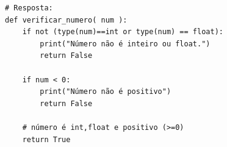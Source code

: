 \ifmostrarGabarito
\begin{verbatim}
# Resposta:
def verificar_numero( num ):
    if not (type(num)==int or type(num) == float):
        print("Número não é inteiro ou float.")
        return False

    if num < 0:
        print("Número não é positivo")
        return False

    # número é int,float e positivo (>=0)
    return True
\end{verbatim}
\fi

